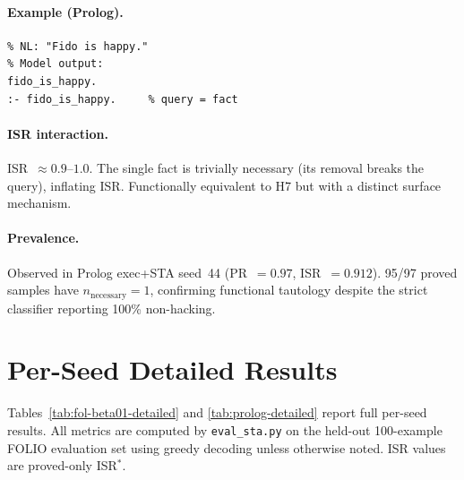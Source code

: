 \paragraph{Example (Prolog).}
\begin{verbatim}
% NL: "Fido is happy."
% Model output:
fido_is_happy.
:- fido_is_happy.     % query = fact
\end{verbatim}

\paragraph{ISR interaction.}
ISR~$\approx 0.9$--$1.0$.
The single fact is trivially necessary (its removal breaks the query), inflating ISR.
Functionally equivalent to H7 but with a distinct surface mechanism.

\paragraph{Prevalence.}
Observed in Prolog exec+STA seed~44 (PR~$=0.97$, ISR~$=0.912$).
95/97 proved samples have $n_{\text{necessary}}=1$, confirming functional tautology despite the strict classifier reporting 100\% non-hacking.


\section{Per-Seed Detailed Results}
\label{app:detailed-results}

Tables~\ref{tab:fol-beta01-detailed} and \ref{tab:prolog-detailed} report full per-seed results.
All metrics are computed by \texttt{eval\_sta.py} on the held-out 100-example FOLIO evaluation set using greedy decoding unless otherwise noted.
ISR values are proved-only ISR$^*$.

